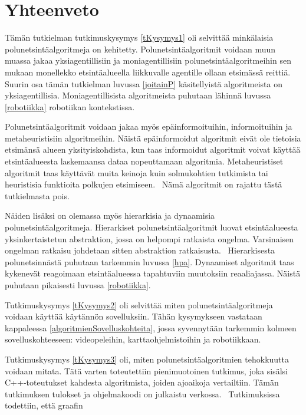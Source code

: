 \chapter{Yhteenveto}\label{yhteenveto}

Tämän tutkielman tutkimuskysymys \ref{tKysymys1} oli selvittää minkälaisia 
polunetsintäalgoritmeja on kehitetty. Polunetsintäalgoritmit voidaan muun 
muassa jakaa yksiagentillisiin ja moniagentillisiin polunetsintäalgoritmeihin 
sen mukaan monellekko etsintäalueella liikkuvalle agentille ollaan etsimässä 
reittiä. Suurin osa tämän tutkielman luvussa \ref{joitainP} käsitellyistä 
algoritmeista on yksiagentillisia. Moniagentillisista algoritmeista puhutaan 
lähinnä luvussa \ref{robotiikka} robotiikan kontekstissa. \par
	Polunetsintäalgoritmit voidaan jakaa myös epäinformoituihin, 
informoituihin ja metaheuristisiin algoritmeihin. Näistä epäinformoidut 
algoritmit eivät ole tietoisia etsimänsä alueen yksityiskohdista, kun taas 
informoidut algoritmit voivat käyttää etsintäalueesta laskemaansa dataa 
nopeuttamaan algoritmia. Metaheuristiset algoritmit taas käyttävät muita 
keinoja kuin solmukohtien tutkimista tai heuristisia funktioita polkujen 
etsimiseen.~\cite{applSciLawande} Nämä algoritmit on rajattu tästä 
tutkielmasta pois. \par
	Näiden lisäksi on olemassa myös hierarkisia ja dynaamisia 
polunetsintäalgoritmeja. Hierarkiset polunetsintäalgoritmit luovat 
etsintäalueesta yksinkertaistetun abs\-traktion, jossa on helpompi ratkaista 
ongelma. Varsinaisen ongelman ratkaisu joh\-detaan sitten abstraktion 
ratkaisusta.~\cite{rda} Hierarkisesta polunetsinnästä puhutaan tarkemmin 
luvussa \ref{hpa}. Dynaamiset algoritmit taas kykenevät reagoimaan 
etsintäalueessa tapahtuviin muutoksiin reaaliajassa. Näistä puhutaan 
pikaisesti luvussa \ref{robotiikka}. \par
	Tutkimuskysymys \ref{tKysymys2} oli selvittää miten 
polunetsintäalgoritmeja voidaan käyttää käytännön sovelluksiin. Tähän 
kysymykseen vastataan kappaleessa \ref{algoritmienSovelluskohteita}, jossa 
syvennytään tarkemmin kolmeen sovelluskohteeseen: videopeleihin, 
karttaohjelmistoihin ja robotiikkaan. \par
	Tutkimuskysymys \ref{tKysymys3} oli, miten 
polunetsintäalgoritmien tehokkuutta voidaan mitata. Tätä varten toteutettiin 
pienimuotoinen tutkimus, joka sisälsi C++-toteutukset kahdesta algoritmista, 
joiden ajoaikoja vertailtiin. Tämän tutkimuksen tulokset ja ohjelmakoodi 
on julkaistu verkossa.~\cite{gt2} Tutkimuksissa todettiin, että graafin 

